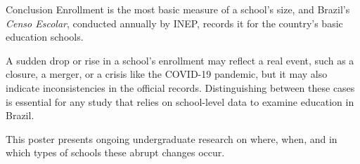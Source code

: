 \documentclass[palette=none,mode=light]{impaTeXPoster}
\begin{document}
\begin{columns}
{}

\begin{postercard}{Conclusion}
Enrollment is the most basic measure of a school's size, and Brazil's
\textit{Censo Escolar}, conducted annually by INEP, records it for the
country's basic education schools.

A sudden drop or rise in a school's enrollment may reflect a real event,
such as a closure, a merger, or a crisis like the COVID-19 pandemic, but it
may also indicate inconsistencies in the official records. Distinguishing
between these cases is essential for any study that relies on school-level
data to examine education in Brazil.

This poster presents ongoing undergraduate research on where, when, and in
which types of schools these abrupt changes occur.
\end{postercard}

\end{columns}

\end{document}
